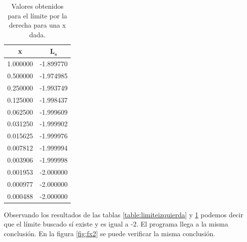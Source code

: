 \hspace{0.5cm}
\begin{minipage}{0.45\linewidth}
    \begin{table}[H]
        \centering
        \begin{tabular}{ll}
            \hline
            \multicolumn{1}{c}{\textbf{x}} & \multicolumn{1}{c}{$\mathbf{L_s}$} \\ \hline
            1.000000                       & -1.899770                          \\
            0.500000                       & -1.974985                          \\
            0.250000                       & -1.993749                          \\
            0.125000                       & -1.998437                          \\
            0.062500                       & -1.999609                          \\
            0.031250                       & -1.999902                          \\
            0.015625                       & -1.999976                          \\
            0.007812                       & -1.999994                          \\
            0.003906                       & -1.999998                          \\
            0.001953                       & -2.000000                          \\
            0.000977                       & -2.000000                          \\
            0.000488                       & -2.000000                          \\ \hline
        \end{tabular}
        \caption{Valores obtenidos para el límite por la derecha para una x dada.}
        \label{table:limitederecha}
    \end{table}
\end{minipage}

Observando los resultados de las tablas \ref{table:limiteizquierda} y \ref{table:limitederecha} podemos decir que el límite buscado sí existe y es igual a -2. El programa llega a la misma conclusión. En la figura \ref{fig:fx2} se puede verificar la misma conclusión.
\pagebreak